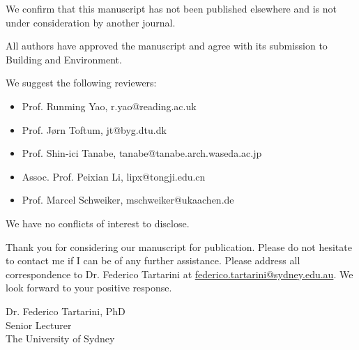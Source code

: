 \documentclass[11pt,a4paper,roman]{moderncv}        %
\begin{document}
We confirm that this manuscript has not been published elsewhere and is not under consideration by another journal.

All authors have approved the manuscript and agree with its submission to Building and Environment. 

We suggest the following reviewers:
\begin{itemize}
    \item Prof. Runming Yao, r.yao@reading.ac.uk
    \item Prof. Jørn Toftum, jt@byg.dtu.dk
    \item Prof. Shin-ici Tanabe, tanabe@tanabe.arch.waseda.ac.jp
    \item Assoc. Prof. Peixian Li, lipx@tongji.edu.cn
    \item Prof. Marcel Schweiker, mschweiker@ukaachen.de
\end{itemize}

We have no conflicts of interest to disclose.

Thank you for considering our manuscript for publication.
Please do not hesitate to contact me if I can be of any further assistance.
Please address all correspondence to Dr. Federico Tartarini at \href{mailto:federico.tartarini@sydney.edu.au}{federico.tartarini@sydney.edu.au}.
We look forward to your positive response.

\bigskip

Dr. Federico Tartarini, PhD\\
Senior Lecturer\\
The University of Sydney\\
\end{document}
